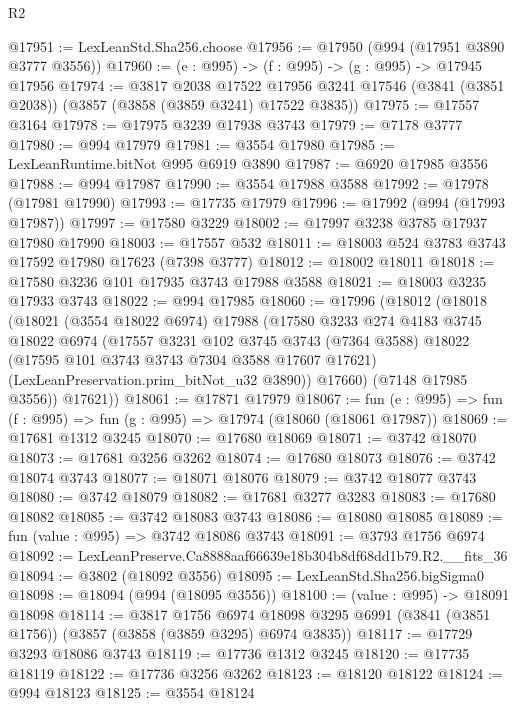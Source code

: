 \begin{lexlean}{R2}
\begin{coremodule}
@17951 := LexLeanStd.Sha256.choose
@17956 := @17950 (@994 (@17951 @3890 @3777 @3556))
@17960 := (e : @995) -> (f : @995) -> (g : @995) -> @17945 @17956
@17974 := @3817
    @2038
    @17522
    @17956
    @3241
    @17546
    (@3841 (@3851 @2038))
    (@3857 (@3858 (@3859 @3241) @17522 @3835))
@17975 := @17557 @3164
@17978 := @17975 @3239 @17938 @3743
@17979 := @7178 @3777
@17980 := @994 @17979
@17981 := @3554 @17980
@17985 := LexLeanRuntime.bitNot @995 @6919 @3890
@17987 := @6920 @17985 @3556
@17988 := @994 @17987
@17990 := @3554 @17988 @3588
@17992 := @17978 (@17981 @17990)
@17993 := @17735 @17979
@17996 := @17992 (@994 (@17993 @17987))
@17997 := @17580 @3229
@18002 := @17997 @3238 @3785 @17937 @17980 @17990
@18003 := @17557 @532
@18011 := @18003 @524 @3783 @3743 @17592 @17980 @17623 (@7398 @3777)
@18012 := @18002 @18011
@18018 := @17580 @3236 @101 @17935 @3743 @17988 @3588
@18021 := @18003 @3235 @17933 @3743
@18022 := @994 @17985
@18060 := @17996
    (@18012
      (@18018
        (@18021
          (@3554 @18022 @6974)
          @17988
          (@17580
            @3233
            @274
            @4183
            @3745
            @18022
            @6974
            (@17557
              @3231
              @102
              @3745
              @3743
              (@7364 @3588)
              @18022
              (@17595 @101 @3743 @3743 @7304 @3588 @17607 @17621)
              (LexLeanPreservation.prim_bitNot_u32 @3890))
            @17660)
          (@7148 @17985 @3556))
        @17621))
@18061 := @17871 @17979
@18067 := fun (e : @995) => fun (f : @995) => fun (g : @995) => @17974 (@18060 (@18061 @17987))
@18069 := @17681 @1312 @3245
@18070 := @17680 @18069
@18071 := @3742 @18070
@18073 := @17681 @3256 @3262
@18074 := @17680 @18073
@18076 := @3742 @18074 @3743
@18077 := @18071 @18076
@18079 := @3742 @18077 @3743
@18080 := @3742 @18079
@18082 := @17681 @3277 @3283
@18083 := @17680 @18082
@18085 := @3742 @18083 @3743
@18086 := @18080 @18085
@18089 := fun (value : @995) => @3742 @18086 @3743
@18091 := @3793 @1756 @6974
@18092 := LexLeanPreserve.Ca8888aaf66639e18b304b8df68dd1b79.R2.__fits_36
@18094 := @3802 (@18092 @3556)
@18095 := LexLeanStd.Sha256.bigSigma0
@18098 := @18094 (@994 (@18095 @3556))
@18100 := (value : @995) -> @18091 @18098
@18114 := @3817
    @1756
    @6974
    @18098
    @3295
    @6991
    (@3841 (@3851 @1756))
    (@3857 (@3858 (@3859 @3295) @6974 @3835))
@18117 := @17729 @3293 @18086 @3743
@18119 := @17736 @1312 @3245
@18120 := @17735 @18119
@18122 := @17736 @3256 @3262
@18123 := @18120 @18122
@18124 := @994 @18123
@18125 := @3554 @18124

\end{coremodule}
\end{lexlean}
